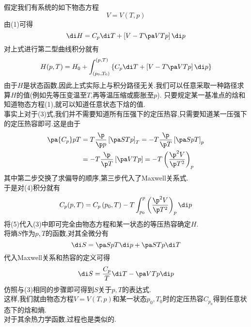\documentclass{ctexart}
\begin{document}
\begin{derivation}\setcounter{equation}{0}
    假定我们有系统的如下物态方程
    \begin{equation}
        V=V(T,p)
    \end{equation}
    由(1)可得
    \begin{equation}
        \di H=C_p\di T+\left[V-T\pa VTp\right]\di p
    \end{equation}
    对上式进行第二型曲线积分就有
    \begin{equation}
        H(p,T)=H_0+\int_{\left(p_0,T_0\right)}^{(p,T)}\left\{C_p\di T+\left[V-T\pa VTp\right]\di p\right\}
    \end{equation}
    由于$H$是状态函数,因此上式实际上与积分路径无关.我们可以任意采取一种路径求算$H$的值(例如先等压变温至$T$,再等温压缩或膨胀至$p$).%
    只要规定某一基准点的焓和知道物态方程(1),就可以知道任意状态下焓的值.\\
    事实上对于(3)式,我们并不需要知道所有压强下的定压热容,只需要知道某一压强下的定压热容即可.这是由于
    \begin{equation}
        \begin{aligned}
            \pa{C_p}pT
            &= T\dfrac{\p}{\p p}\left[\pa STp\right]_T=-T\dfrac{\p}{\p T}\left[\pa SpT\right]_p \\
            &= -T\dfrac{\p}{\p T}\left[\pa VTp\right]=-T\left(\dfrac{\p^2 V}{\p T^2}\right)_p
        \end{aligned}
    \end{equation}
    其中第二步交换了求偏导的顺序,第三步代入了Maxwell关系式.\\
    于是对(4)积分就有
    \begin{equation}
        C_p(p,T)=C_p\left(p_0,T\right)-T\int_{p_0}^p\left(\dfrac{\p^2 V}{\p T^2}\right)_p\di p
    \end{equation}
    将(5)代入(3)中即可完全由物态方程和某一状态的等压热容确定$H$.\\
    将熵$S$作为$p,T$的函数,对其全微分有
    \begin{equation}
        \di S=\pa SpT\di p+\pa STp\di T
    \end{equation}
    代入Maxwell关系和热容的定义可得
    \begin{equation}
        \di S=\dfrac{C_p}{T}\di T-\pa VTp\di p
    \end{equation}
    仿照与(3)相同的步骤即可得到$S$关于$p,T$的表达式.\\
    这样,我们就由物态方程$V=V(T,p)$和某一状态$p_0,T_0$时的定压热容$C_{p_0}$得到任意状态下的焓和熵.\\
    对于其余热力学函数,过程也是类似的.
\end{derivation}
\end{document}
